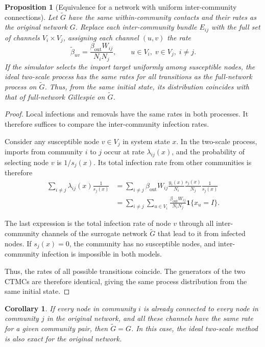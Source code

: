 \documentclass[a4paper,fleqn]{cas-sc}
\newtheorem{proposition}{Proposition}
\newtheorem{corollary}{Corollary}
\newcommand{\ind}{\mathbf{1}}
\begin{document}
\begin{proposition}[Equivalence for a network with uniform inter-community connections]
\label{prop:surrogate}
Let $\tilde G$ have the same within-community contacts and their rates as the original network $G$. Replace each inter-community bundle $E_{ij}$ with the full set of channels $V_i\times V_j$, assigning each channel $(u,v)$ the rate
\[
\tilde\beta_{uv}
=
\frac{\beta_{\mathrm{out}}W_{ij}}{N_iN_j},
\qquad u\in V_i,\;v\in V_j,\;i\neq j.
\]
If the simulator selects the import target uniformly among susceptible nodes, the ideal two-scale process has the same rates for all transitions as the full-network process on $\tilde G$. Thus, from the same initial state, its distribution coincides with that of full-network Gillespie on $\tilde G$.
\end{proposition}

\begin{proof}
Local infections and removals have the same rates in both processes. It therefore suffices to compare the inter-community infection rates.

Consider any susceptible node $v\in V_j$ in system state $x$. In the two-scale process, imports from community $i$ to $j$ occur at rate $\lambda_{ij}(x)$, and the probability of selecting node $v$ is $1/s_j(x)$. Its total infection rate from other communities is therefore
\[
\begin{aligned}
\sum_{i\neq j}\lambda_{ij}(x)\frac{1}{s_j(x)}
&=
\sum_{i\neq j}
\beta_{\mathrm{out}}W_{ij}
\frac{y_i(x)}{N_i}
\frac{s_j(x)}{N_j}
\frac{1}{s_j(x)}
\\
&=
\sum_{i\neq j}
\sum_{u\in V_i}
\frac{\beta_{\mathrm{out}}W_{ij}}{N_iN_j}
\ind\{x_u=I\}.
\end{aligned}
\]

The last expression is the total infection rate of node $v$ through all inter-community channels of the surrogate network $\tilde G$ that lead to it from infected nodes. If $s_j(x)=0$, the community has no susceptible nodes, and inter-community infection is impossible in both models.

Thus, the rates of all possible transitions coincide. The generators of the two CTMCs are therefore identical, giving the same process distribution from the same initial state.
\end{proof}

\begin{corollary}
\label{cor:exact}
If every node in community $i$ is already connected to every node in community $j$ in the original network, and all these channels have the same rate for a given community pair, then $\tilde G=G$. In this case, the ideal two-scale method is also exact for the original network.
\end{corollary}
\end{document}
